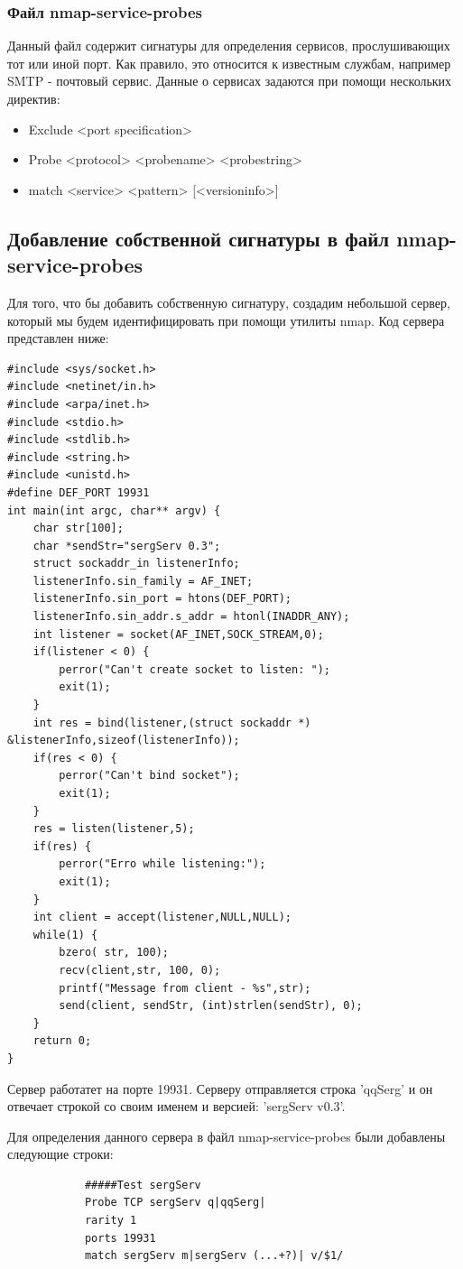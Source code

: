\documentclass[10pt,a4paper]{report}
\begin{document}
		\subsubsection{Файл nmap-service-probes}
			Данный файл содержит сигнатуры для определения сервисов, прослушивающих тот или иной порт. Как правило, это относится к известным службам, например SMTP - почтовый сервис. Данные о сервисах задаются при помощи нескольких директив:
			\begin{itemize}
				\item Exclude <port specification>
				\item Probe <protocol> <probename> <probestring>
				\item match <service> <pattern> [<versioninfo>]
			\end{itemize}
	\subsection{Добавление собственной сигнатуры в файл nmap-service-probes}
		Для того, что бы добавить собственную сигнатуру, создадим небольшой сервер, который мы будем идентифицировать при помощи утилиты nmap. Код сервера представлен ниже:
		\begin{verbatim}
#include <sys/socket.h> 
#include <netinet/in.h> 
#include <arpa/inet.h> 
#include <stdio.h> 
#include <stdlib.h> 
#include <string.h> 
#include <unistd.h> 
#define DEF_PORT 19931 
int main(int argc, char** argv) { 
	char str[100];
	char *sendStr="sergServ 0.3";
	struct sockaddr_in listenerInfo; 
	listenerInfo.sin_family = AF_INET; 
	listenerInfo.sin_port = htons(DEF_PORT); 
	listenerInfo.sin_addr.s_addr = htonl(INADDR_ANY); 
	int listener = socket(AF_INET,SOCK_STREAM,0); 
	if(listener < 0) { 
		perror("Can't create socket to listen: "); 
		exit(1); 
	} 
	int res = bind(listener,(struct sockaddr *) &listenerInfo,sizeof(listenerInfo)); 
	if(res < 0) { 
		perror("Can't bind socket"); 
		exit(1); 
	} 
	res = listen(listener,5); 
	if(res) { 
		perror("Erro while listening:"); 
		exit(1); 
	}
	int client = accept(listener,NULL,NULL);
	while(1) {
		bzero( str, 100);
		recv(client,str, 100, 0); 
		printf("Message from client - %s",str);
		send(client, sendStr, (int)strlen(sendStr), 0);
	}
	return 0; 
}
		\end{verbatim}
		Сервер работатет на порте 19931. Серверу отправляется строка 'qqSerg' и он отвечает строкой со своим именем и версией: 'sergServ v0.3'.
		
		Для определения данного сервера в файл nmap-service-probes были добавлены следующие строки:
		\begin{verbatim}
			#####Test sergServ
			Probe TCP sergServ q|qqSerg|
			rarity 1
			ports 19931
			match sergServ m|sergServ (...+?)| v/$1/
		\end{verbatim}
		
\end{document}
